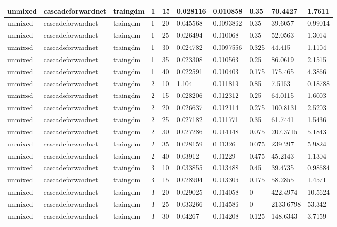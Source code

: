 \begin{longtable}{lllllllll}
unmixed & cascadeforwardnet & traingdm & 1 & 15 & 0.028116 & 0.010858 & 0.35 & 70.4427 & 1.7611 \\ \hline 
unmixed & cascadeforwardnet & traingdm & 1 & 20 & 0.045568 & 0.0093862 & 0.35 & 39.6057 & 0.99014 \\ \hline 
unmixed & cascadeforwardnet & traingdm & 1 & 25 & 0.026494 & 0.010068 & 0.35 & 52.0563 & 1.3014 \\ \hline 
unmixed & cascadeforwardnet & traingdm & 1 & 30 & 0.024782 & 0.0097556 & 0.325 & 44.415 & 1.1104 \\ \hline 
unmixed & cascadeforwardnet & traingdm & 1 & 35 & 0.023308 & 0.010563 & 0.25 & 86.0619 & 2.1515 \\ \hline 
unmixed & cascadeforwardnet & traingdm & 1 & 40 & 0.022591 & 0.010403 & 0.175 & 175.465 & 4.3866 \\ \hline 
unmixed & cascadeforwardnet & traingdm & 2 & 10 & 1.104 & 0.011819 & 0.85 & 7.5153 & 0.18788 \\ \hline 
unmixed & cascadeforwardnet & traingdm & 2 & 15 & 0.028206 & 0.012312 & 0.25 & 64.0115 & 1.6003 \\ \hline 
unmixed & cascadeforwardnet & traingdm & 2 & 20 & 0.026637 & 0.012114 & 0.275 & 100.8131 & 2.5203 \\ \hline 
unmixed & cascadeforwardnet & traingdm & 2 & 25 & 0.027182 & 0.011771 & 0.35 & 61.7441 & 1.5436 \\ \hline 
unmixed & cascadeforwardnet & traingdm & 2 & 30 & 0.027286 & 0.014148 & 0.075 & 207.3715 & 5.1843 \\ \hline 
unmixed & cascadeforwardnet & traingdm & 2 & 35 & 0.028159 & 0.01326 & 0.075 & 239.297 & 5.9824 \\ \hline 
unmixed & cascadeforwardnet & traingdm & 2 & 40 & 0.03912 & 0.01229 & 0.475 & 45.2143 & 1.1304 \\ \hline 
unmixed & cascadeforwardnet & traingdm & 3 & 10 & 0.033855 & 0.013488 & 0.45 & 39.4735 & 0.98684 \\ \hline 
unmixed & cascadeforwardnet & traingdm & 3 & 15 & 0.028904 & 0.013306 & 0.175 & 58.2855 & 1.4571 \\ \hline 
unmixed & cascadeforwardnet & traingdm & 3 & 20 & 0.029025 & 0.014058 & 0 & 422.4974 & 10.5624 \\ \hline 
unmixed & cascadeforwardnet & traingdm & 3 & 25 & 0.033266 & 0.014586 & 0 & 2133.6798 & 53.342 \\ \hline 
unmixed & cascadeforwardnet & traingdm & 3 & 30 & 0.04267 & 0.014208 & 0.125 & 148.6343 & 3.7159 \\ \hline 

\end{longtable}
